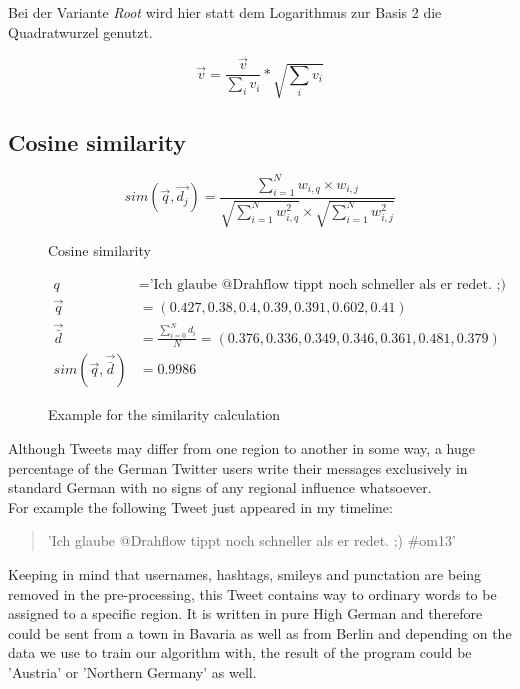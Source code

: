 \documentclass[../Main.tex]{subfiles}
\begin{document}
Bei der Variante \textit{Root} wird hier statt dem Logarithmus zur Basis 2 die Quadratwurzel genutzt.

$$\vec v = \frac{\vec v}{\sum_i v_i} * \sqrt{\sum_i v_i}$$

\subsection{Cosine similarity}
\begin{figure}
  \[ sim(\vec{q},\vec{d_j}) = \frac{\sum^N_{i=1} w_{i,q} \times w_{i,j}}{\sqrt{\sum^N_{i=1}w^2_{i,q}} \times \sqrt{\sum^N_{i=1}w^2_{i,j}}} \]
  \caption{Cosine similarity}
  \label{cos_sim}
\end{figure}
\begin{figure}
 \begin{align*}
  q &= \textrm{'Ich glaube @Drahflow tippt noch schneller als er redet. ;) \#om13' } \\
  \vec{q} &= (0.427, 0.38, 0.4, 0.39, 0.391, 0.602,  0.41) \\ 
   \vec{\bar{d}} &= \frac{\sum^N_{i=0} d_i}{N} =  (0.376, 0.336, 0.349, 0.346, 0.361, 0.481,  0.379) \\
  sim(\vec{q}, \vec{\bar{d}}) &= 0.9986 
\end{align*}
  \caption{Example for the similarity calculation}
  \label{cos_sim_example}
\end{figure}
Although Tweets may differ from one region to another in some way, a huge percentage of the German Twitter users write their messages exclusively in standard German with no signs of any regional influence whatsoever.  \\
For example the following Tweet just appeared in my timeline:
\begin{quote}
'Ich glaube @Drahflow tippt noch schneller als er redet. ;) \#om13'
\end{quote}
Keeping in mind that  usernames, hashtags, smileys and punctation are being removed in the pre-processing, this Tweet contains way to ordinary words to be assigned to a specific region. It is written in pure High German and therefore could be sent from a town in Bavaria as well as from Berlin and depending on the data we use to train our algorithm with, the result of the program could be 'Austria' or 'Northern Germany' as well.
\end{document}
